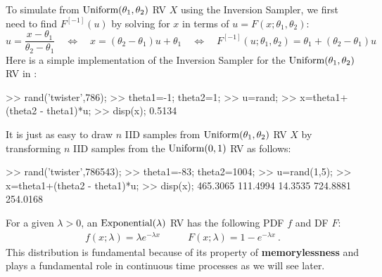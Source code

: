 \begin{simulation}\label{SIM:Uniformab}
To simulate from $\mbox{{\rm Uniform}}(\theta_1,\theta_2)$ RV $X$ using the Inversion Sampler, we first need to find $F^{[-1]}(u)$ by solving for $x$ in terms of $u=F(x;\theta_1,\theta_2)$:
\[
u = \frac{x-\theta_1}{\theta_2-\theta_1} \quad \iff  \quad x = (\theta_2-\theta_1)u+\theta_1 \quad  \iff \quad  F^{[-1]}(u;\theta_1,\theta_2) = \theta_1+(\theta_2-\theta_1)u
\]
Here is a simple implementation of the Inversion Sampler for the $\mbox{{\rm Uniform}}(\theta_1,\theta_2)$ RV in \Matlab:
\begin{VrbM}
>> rand('twister',786); %
>> theta1=-1; theta2=1; %
>> u=rand; %
>> x=theta1+(theta2 - theta1)*u; %
>> disp(x); %
    0.5134
\end{VrbM}
It is just as easy to draw $n$ IID samples from $\mbox{{\rm Uniform}}(\theta_1,\theta_2)$ RV $X$ by transforming $n$ IID samples from the $\mbox{{\rm Uniform}}(0,1)$ RV as follows:
\begin{VrbM}
>> rand('twister',786543); %
>> theta1=-83; theta2=1004; %
>> u=rand(1,5); %
>> x=theta1+(theta2 - theta1)*u; %
>> disp(x); %
  465.3065  111.4994   14.3535  724.8881  254.0168
\end{VrbM}
\end{simulation}


\begin{model}[$\exponential(\lambda)$]
For a given $\lambda > 0$, an $\exponential(\lambda)$ RV has the following PDF $f$ and DF $F$:
\begin{eqnarray}\label{E:Exponentialpdfcdf}
f(x; \lambda) = \lambda e^{-\lambda x} \qquad &
F(x; \lambda)= 1-e^{-\lambda x}  \ .
\end{eqnarray}
This distribution is fundamental because of its property of {\bf memorylessness} and plays a fundamental role in continuous time
processes as we will see later.
\end{model}

